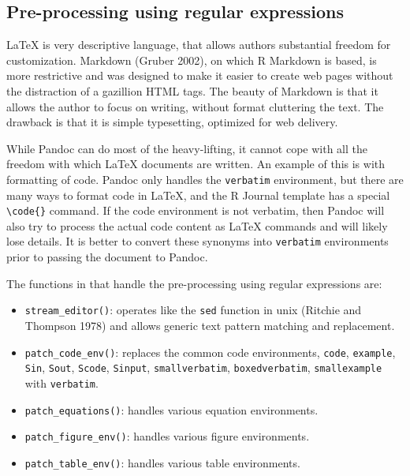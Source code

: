 \hypertarget{pre-processing-using-regular-expressions}{%
\subsection{Pre-processing using regular expressions}\label{pre-processing-using-regular-expressions}}

LaTeX is very descriptive language, that allows authors substantial freedom for customization. Markdown (Gruber 2002), on which R Markdown is based, is more restrictive and was designed to make it easier to create web pages without the distraction of a gazillion HTML tags. The beauty of Markdown is that it allows the author to focus on writing, without format cluttering the text. The drawback is that it is simple typesetting, optimized for web delivery.

While Pandoc can do most of the heavy-lifting, it cannot cope with all the freedom with which LaTeX documents are written. An example of this is with formatting of code. Pandoc only handles the \texttt{verbatim} environment, but there are many ways to format code in LaTeX, and the R Journal template has a special \texttt{\textbackslash{}code\{\}} command. If the code environment is not verbatim, then Pandoc will also try to process the actual code content as LaTeX commands and will likely lose details. It is better to convert these synonyms into \texttt{verbatim} environments prior to passing the document to Pandoc.

The functions in  that handle the pre-processing using regular expressions are:

\begin{itemize}
\tightlist
\item
  \texttt{stream\_editor()}: operates like the \texttt{sed} function in unix (Ritchie and Thompson 1978) and allows generic text pattern matching and replacement.
\item
  \texttt{patch\_code\_env()}: replaces the common code environments, \texttt{code}, \texttt{example}, \texttt{Sin}, \texttt{Sout}, \texttt{Scode}, \texttt{Sinput}, \texttt{smallverbatim}, \texttt{boxedverbatim}, \texttt{smallexample} with \texttt{verbatim}.
\item
  \texttt{patch\_equations()}: handles various equation environments.
\item
  \texttt{patch\_figure\_env()}: handles various figure environments.
\item
  \texttt{patch\_table\_env()}: handles various table environments.
\end{itemize}

